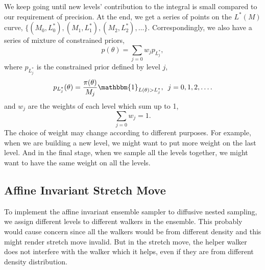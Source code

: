 \documentclass[letterpaper, preprint]{aastex}
\begin{document}
We keep going until new levels' contribution to the integral is small compared to our requirement of precision. At the end, we get a series of points on the $L^*(M)$ curve, $\{(M_0, L_0^*),(M_1,L_1^*),(M_2,L_2^*), \ldots\}$. Correspondingly, we also have a series of mixture of constrained priors,
\begin{equation}
p(\theta) = \sum_{j=0} w_j p_{L_j^*},
\label{eq:mixture-constrained-prior}
\end{equation}
where $p_{L_j^*}$ is the constrained prior defined by level $j$,
\begin{equation} 
p_{L_j^*}(\theta) = \frac{\pi(\theta)}{M_j}\mathbbm{1}_{L(\theta)>L_j^*},\,\,\,j=0,1,2,\ldots.
\end{equation}
and $w_j$ are the weights of each level which sum up to 1,
\begin{equation}
\sum_{j=0}w_j = 1.
\end{equation}
The choice of weight may change according to different purposes. For example, when we are building a new level, we might want to put more weight on the last level. And in the final stage, when we sample all the levels together, we might want to have the same weight on all the levels.

\subsection{Affine Invariant Stretch Move}
To implement the affine invariant ensemble sampler to diffusive nested sampling, we assign different levels to different walkers in the ensemble. This probably would cause concern since all the walkers would be from different density and this might render stretch move invalid. But in the stretch move, the helper walker does not interfere with the walker which it helps, even if they are from different density distribution. 
\end{document}
